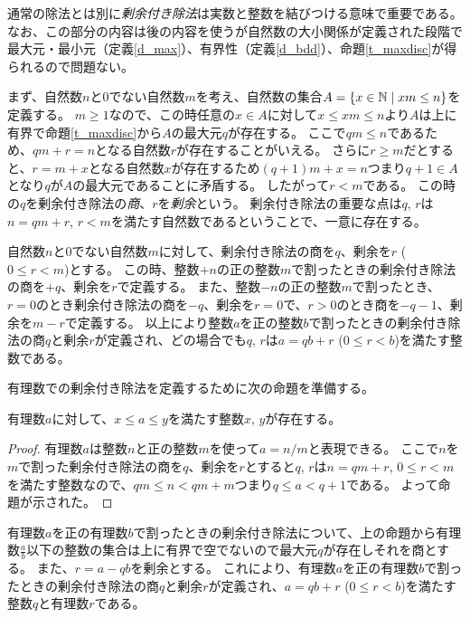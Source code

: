通常の除法とは別に\emph{剰余付き除法}は実数と整数を結びつける意味で重要である。
なお、この部分の内容は後の内容を使うが自然数の大小関係が定義された段階で最大元・最小元（定義\ref{d_max}）、有界性（定義\ref{d_bdd}）、命題\ref{t_maxdisc}が得られるので問題ない。

まず、自然数$n$と$0$でない自然数$m$を考え、自然数の集合$A = \{ x \in \mathbb{N} \mid x m \le n \}$を定義する。
$m \ge 1$なので、この時任意の$x \in A$に対して$x \le x m \le n$より$A$は上に有界で命題\ref{t_maxdisc}から$A$の最大元$q$が存在する。
ここで$q m \le n$であるため、$q m+r = n$となる自然数$r$が存在することがいえる。
さらに$r \ge m$だとすると、$r = m+x$となる自然数$x$が存在するため$(q+1) m+x = n$つまり$q+1 \in A$となり$q$が$A$の最大元であることに矛盾する。
したがって$r < m$である。
この時の$q$を剰余付き除法の\emph{商}、$r$を\emph{剰余}という。
剰余付き除法の重要な点は$q$, $r$は$n = q m+r$, $r < m$を満たす自然数であるということで、一意に存在する。

自然数$n$と$0$でない自然数$m$に対して、剰余付き除法の商を$q$、剰余を$r$ ($0 \le r < m$)とする。
この時、整数$+n$の正の整数$m$で割ったときの剰余付き除法の商を$+q$、剰余を$r$で定義する。
また、整数$-n$の正の整数$m$で割ったとき、$r = 0$のとき剰余付き除法の商を$-q$、剰余を$r = 0$で、$r > 0$のとき商を$-q-1$、剰余を$m-r$で定義する。
以上により整数$a$を正の整数$b$で割ったときの剰余付き除法の商$q$と剰余$r$が定義され、どの場合でも$q$, $r$は$a = q b+r$ ($0 \le r < b$)を満たす整数である。

有理数での剰余付き除法を定義するために次の命題を準備する。

\begin{proposition}
\label{t_int_rational}
有理数$a$に対して、$x \le a \le y$を満たす整数$x$, $y$が存在する。
\end{proposition}

\begin{proof}
有理数$a$は整数$n$と正の整数$m$を使って$a = n/m$と表現できる。
ここで$n$を$m$で割った剰余付き除法の商を$q$、剰余を$r$とすると$q$, $r$は$n = q m+r$, $0 \le r < m$を満たす整数なので、$q m \le n < q m+m$つまり$q \le a < q+1$である。
よって命題が示された。
\end{proof}

有理数$a$を正の有理数$b$で割ったときの剰余付き除法について、上の命題から有理数$\frac{a}{b}$以下の整数の集合は上に有界で空でないので最大元$q$が存在しそれを商とする。
また、$r = a-q b$を剰余とする。
これにより、有理数$a$を正の有理数$b$で割ったときの剰余付き除法の商$q$と剰余$r$が定義され、$a = q b+r$ ($0 \le r < b$)を満たす整数$q$と有理数$r$である。


